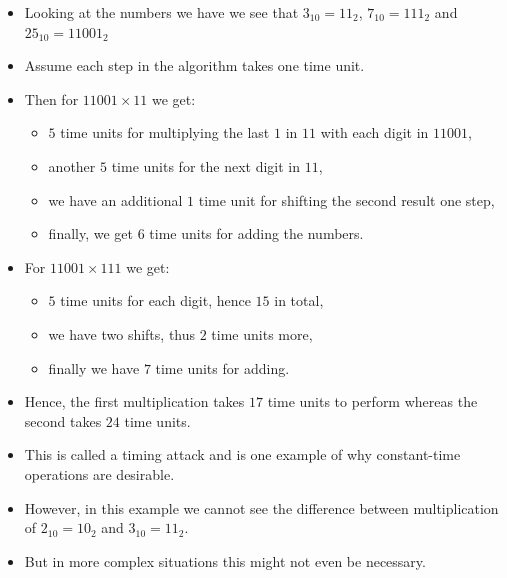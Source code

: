 \documentclass{beamer}
\begin{document}
\begin{frame}
  \begin{itemize}
    \item Looking at the numbers we have we see that \(3_{10} = 11_2\), 
      \(7_{10} = 111_2\) and \(25_{10} = 11001_2\)

    \item Assume each step in the algorithm takes one time unit.

    \item Then for \(11001\times 11\) we get:
      \begin{itemize}
        \item \(5\) time units for multiplying the last \(1\) in \(11\) with 
          each digit in \(11001\),

        \item another \(5\) time units for the next digit in \(11\),

        \item we have an additional \(1\) time unit for shifting the second 
          result one step,

        \item finally, we get \(6\) time units for adding the numbers.
      \end{itemize}

    \item For \(11001\times 111\) we get:
      \begin{itemize}
        \item \(5\) time units for each digit, hence \(15\) in total,

        \item we have two shifts, thus \(2\) time units more,

        \item finally we have \(7\) time units for adding.
      \end{itemize}
  \end{itemize}
\end{frame}

\begin{frame}
  \begin{itemize}
    \item Hence, the first multiplication takes \(17\) time units to perform 
      whereas the second takes \(24\) time units.

    \item This is called a timing attack and is one example of why 
      constant-time operations are desirable.

    \item However, in this example we cannot see the difference between 
      multiplication of \(2_{10} = 10_2\) and \(3_{10} = 11_2\).

    \item But in more complex situations this might not even be necessary.

  \end{itemize}
\end{frame}
\end{document}
